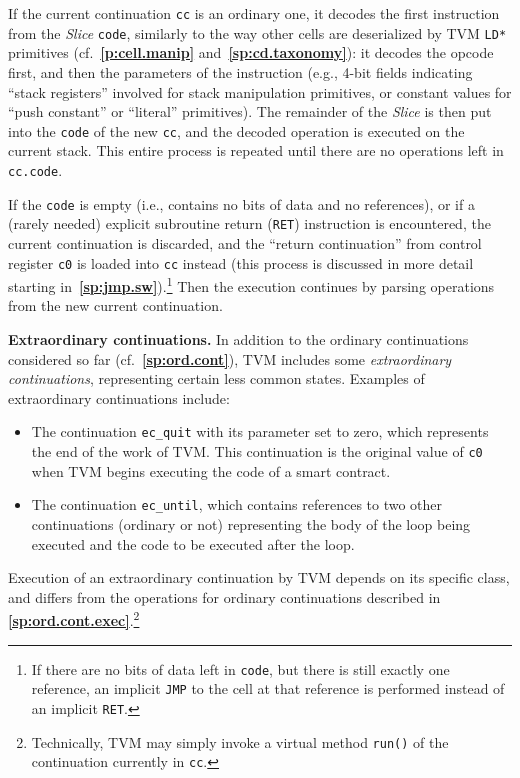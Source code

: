 \documentclass[12pt,oneside]{article}
\def\makepoint#1{\medbreak\noindent{\bf #1.\ }}
\def\nxsubpoint{\refstepcounter{subsubsection}%
    \smallbreak\makepoint{\thesubsubsection}}
\def\refpoint#1{{\rm\textbf{\ref{#1}}}}
\let\ptref=\refpoint
\def\emb#1{\textbf{#1.}}
\begin{document}
If the current continuation \texttt{cc} is an ordinary one, it decodes the first instruction from the {\em Slice\/} \texttt{code}, similarly to the way other cells are deserialized by TVM \texttt{LD*} primitives (cf.~\ptref{p:cell.manip} and~\ptref{sp:cd.taxonomy}): it decodes the opcode first, and then the parameters of the instruction (e.g., 4-bit fields indicating ``stack registers'' involved for stack manipulation primitives, or constant values for ``push constant'' or ``literal'' primitives). The remainder of the {\em Slice} is then put into the \texttt{code} of the new {\tt cc}, and the decoded operation is executed on the current stack. This entire process is repeated until there are no operations left in {\tt cc.code}.

If the {\tt code} is empty (i.e., contains no bits of data and no references), or if a (rarely needed) explicit subroutine return ({\tt RET}) instruction is encountered, the current continuation is discarded, and the ``return continuation'' from control register {\tt c0} is loaded into {\tt cc} instead (this process is discussed in more detail starting in~\ptref{sp:jmp.sw}).\footnote{If there are no bits of data left in {\tt code}, but there is still exactly one reference, an implicit {\tt JMP} to the cell at that reference is performed instead of an implicit {\tt RET}.} Then the execution continues by parsing operations from the new current continuation.

\nxsubpoint\label{sp:extraord.cont}\emb{Extraordinary continuations}
In addition to the ordinary continuations considered so far (cf.~\ptref{sp:ord.cont}), TVM includes some {\em extraordinary continuations}, representing certain less common states. Examples of extraordinary continuations include:

\begin{itemize}
\item The continuation {\tt ec\_quit} with its parameter set to zero, which represents the end of the work of TVM. This continuation is the original value of {\tt c0} when TVM begins executing the code of a smart contract.
\item The continuation {\tt ec\_until}, which contains references to two other continuations (ordinary or not) representing the body of the loop being executed and the code to be executed after the loop.
\end{itemize}
Execution of an extraordinary continuation by TVM depends on its specific class, and differs from the operations for ordinary continuations described in \ptref{sp:ord.cont.exec}.\footnote{Technically, TVM may simply invoke a virtual method \texttt{run()} of the continuation currently in {\tt cc}.}
\end{document}
